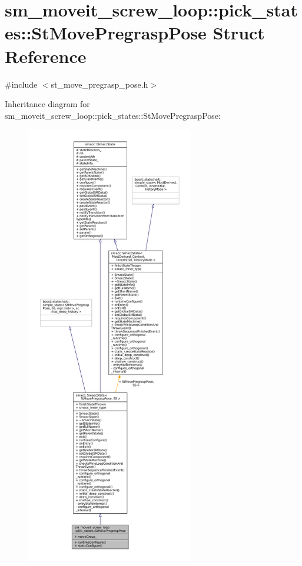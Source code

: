 \hypertarget{structsm__moveit__screw__loop_1_1pick__states_1_1StMovePregraspPose}{}\section{sm\+\_\+moveit\+\_\+screw\+\_\+loop\+:\+:pick\+\_\+states\+:\+:St\+Move\+Pregrasp\+Pose Struct Reference}
\label{structsm__moveit__screw__loop_1_1pick__states_1_1StMovePregraspPose}


{\ttfamily \#include $<$st\+\_\+move\+\_\+pregrasp\+\_\+pose.\+h$>$}



Inheritance diagram for sm\+\_\+moveit\+\_\+screw\+\_\+loop\+:\+:pick\+\_\+states\+:\+:St\+Move\+Pregrasp\+Pose\+:
\nopagebreak
\begin{figure}[H]
\begin{center}
\leavevmode
\includegraphics[height=550pt]{structsm__moveit__screw__loop_1_1pick__states_1_1StMovePregraspPose__inherit__graph}
\end{center}
\end{figure}


